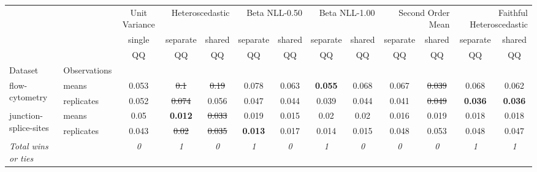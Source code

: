 \begin{tabular}{ll|c|cc|cc|cc|cc|cc}
\toprule
{} & {} & {Unit Variance} & \multicolumn{2}{r}{Heteroscedastic} & \multicolumn{2}{r}{Beta NLL-0.50} & \multicolumn{2}{r}{Beta NLL-1.00} & \multicolumn{2}{r}{Second Order Mean} & \multicolumn{2}{r}{Faithful Heteroscedastic} \\
{} & {} & {single} & {separate} & {shared} & {separate} & {shared} & {separate} & {shared} & {separate} & {shared} & {separate} & {shared} \\
{} & {} & {QQ} & {QQ} & {QQ} & {QQ} & {QQ} & {QQ} & {QQ} & {QQ} & {QQ} & {QQ} & {QQ} \\
{Dataset} & {Observations} & {} & {} & {} & {} & {} & {} & {} & {} & {} & {} & {} \\
\midrule
\multirow[t]{2}{*}{flow-cytometry} & means & 0.053 & \sout{0.1} & \sout{0.19} & 0.078 & 0.063 & \textbf{0.055} & 0.068 & 0.067 & \sout{0.039} & 0.068 & 0.062 \\
 & replicates & 0.052 & \sout{0.074} & 0.056 & 0.047 & 0.044 & 0.039 & 0.044 & 0.041 & \sout{0.049} & \textbf{0.036} & \textbf{0.036} \\
\multirow[t]{2}{*}{junction-splice-sites} & means & 0.05 & \textbf{0.012} & \sout{0.033} & 0.019 & 0.015 & 0.02 & 0.02 & 0.016 & 0.019 & 0.018 & 0.018 \\
 & replicates & 0.043 & \sout{0.02} & \sout{0.035} & \textbf{0.013} & 0.017 & 0.014 & 0.015 & 0.048 & 0.053 & 0.048 & 0.047 \\
\textit{{Total wins or ties}} &  & \textit{0} & \textit{1} & \textit{0} & \textit{1} & \textit{0} & \textit{1} & \textit{0} & \textit{0} & \textit{0} & \textit{1} & \textit{1} \\
\bottomrule
\end{tabular}
